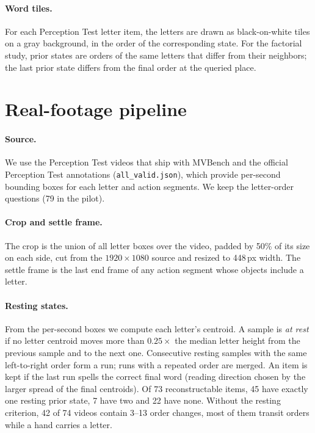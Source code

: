 \paragraph{Word tiles.} For each Perception Test letter item, the letters are drawn as black-on-white tiles on a gray background, in the order of the corresponding state. For the factorial study, prior states are orders of the same letters that differ from their neighbors; the last prior state differs from the final order at the queried place.

\section{Real-footage pipeline}
\label{app:real}

\paragraph{Source.} We use the Perception Test videos that ship with MVBench and the official Perception Test annotations (\texttt{all\_valid.json}), which provide per-second bounding boxes for each letter and action segments. We keep the letter-order questions (79 in the pilot).

\paragraph{Crop and settle frame.} The crop is the union of all letter boxes over the video, padded by 50\% of its size on each side, cut from the $1920\times1080$ source and resized to 448\,px width. The settle frame is the last end frame of any action segment whose objects include a letter.

\paragraph{Resting states.} From the per-second boxes we compute each letter's centroid. A sample is \emph{at rest} if no letter centroid moves more than $0.25\times$ the median letter height from the previous sample and to the next one. Consecutive resting samples with the same left-to-right order form a run; runs with a repeated order are merged. An item is kept if the last run spells the correct final word (reading direction chosen by the larger spread of the final centroids). Of 73 reconstructable items, 45 have exactly one resting prior state, 7 have two and 22 have none. Without the resting criterion, 42 of 74 videos contain 3--13 order changes, most of them transit orders while a hand carries a letter.

